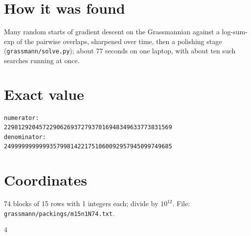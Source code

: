 \documentclass[11pt,a4paper]{article}
\begin{document}
\section{How it was found}
Many random starts of gradient descent on the Grassmannian against a log-sum-exp of the pairwise overlaps, sharpened over time, then a polishing stage (\texttt{grassmann/solve.py}); about 77 seconds on one laptop, with about ten such searches running at once.


\appendix
\section{Exact value}
{\small
\begin{verbatim}
numerator:
229812920457229062693727937016948349633773831569
denominator:
249999999999935799814221751060092957945099749685
\end{verbatim}}

\section{Coordinates}
74 blocks of 15 rows with 1 integers each; divide by $10^{12}$. File: \texttt{grassmann/packings/m15n1N74.txt}.
{\tiny
\begin{multicols}{4}
\end{multicols}}
\end{document}
